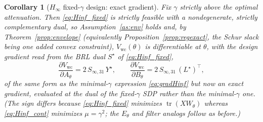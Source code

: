 \documentclass[twocolumn,amsthm]{autart}
\newtheorem{corollary}{Corollary}
\begin{document}
\begin{corollary}[$H_\infty$ fixed-$\gamma$ design: exact gradient]\label{cor:hinf_fixed}
Fix $\gamma$ strictly above the optimal attenuation. Then \eqref{eq:Hinf_fixed} is
strictly feasible with a nondegenerate, strictly complementary dual, so
Assumption~\ref{as:env} holds and, by Theorem~\ref{prop:envelope} (equivalently
Proposition~\ref{prop:regexact}, the Schur slack being one added convex constraint),
$V_{\mathrm{wc}}(\theta)$ is \emph{differentiable} at $\theta$, with the design
gradient read from the BRL dual $S^\star$ of \eqref{eq:Hinf_fixed},
\begin{equation}\label{eq:gradHinf_fixed}
\frac{\partial V_{\mathrm{wc}}}{\partial A_\theta}=2\,S_{\infty,31}\,Y^\star,\qquad
\frac{\partial V_{\mathrm{wc}}}{\partial B_\theta}=2\,S_{\infty,31}\,(L^\star)^\top,
\end{equation}
of the \emph{same form} as the minimal-$\gamma$ expression \eqref{eq:gradHinf} but now
an \emph{exact} gradient, evaluated at the dual of the fixed-$\gamma$ SDP rather than
the minimal-$\gamma$ one. (The sign differs because \eqref{eq:Hinf_fixed} minimizes
$\operatorname{tr}(XW_\theta)$ whereas \eqref{eq:Hinf_cont} minimizes $\mu=\gamma^2$;
the $E_\theta$ and filter analogs follow as before.)
\end{corollary}
\end{document}
